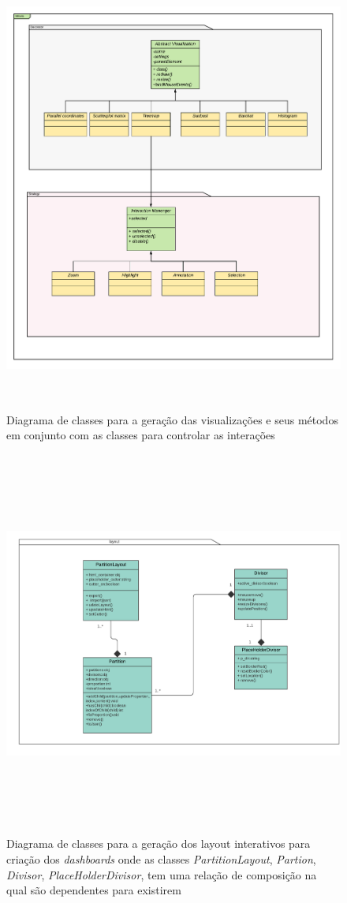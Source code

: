 \documentclass[
	12pt,				%
	openright,			%
	oneside,			%
	a4paper,			%
	english,			%
	brazil				%
	]{abntex2}
\begin{document}
\begin{figure}
	\caption{\label{classe_uml}Diagrama de classes para a geração das visualizações e seus métodos em conjunto com as classes para controlar as interações  }
	\begin{center}
	    \includegraphics[width=35pc,height=35pc]{figures/visApplication uml(1).pdf}
	\end{center}
\end{figure}

\begin{figure}
	\caption{\label{classe_uml_layout}Diagrama de classes para a geração dos layout interativos para criação dos \textit{dashboards} onde as classes \textit{PartitionLayout}, \textit{Partion}, \textit{Divisor}, \textit{PlaceHolderDivisor}, tem uma relação de composição na qual são dependentes para existirem }
	\begin{center}
	    \includegraphics[width=40pc,height=30pc]{figures/Diagrama layout parrtition.pdf}
	\end{center}
\end{figure}
\end{document}
